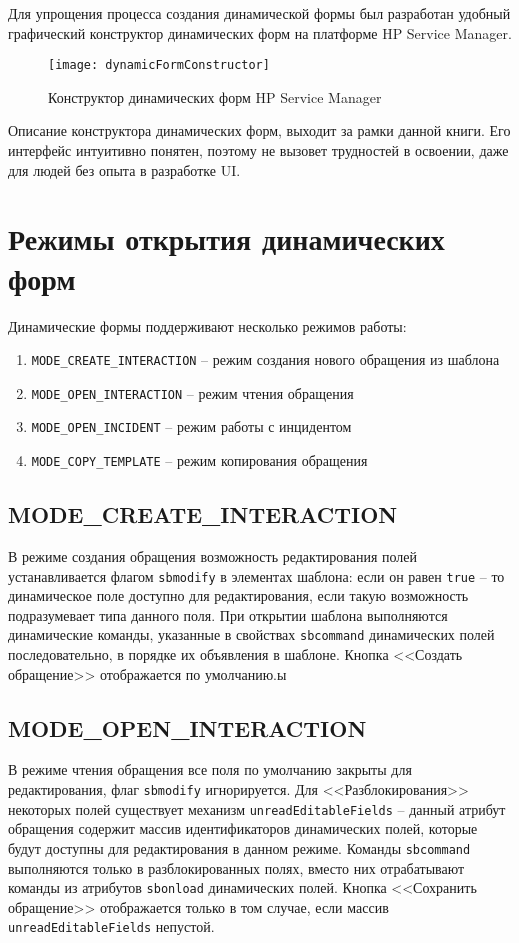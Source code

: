 \documentclass[../index.tex]{subfiles}
\begin{document}
Для упрощения процесса создания динамической формы был разработан удобный графический конструктор
динамических форм на платформе HP Service Manager.

\begin{figure}[h]
    \texttt{[image: dynamicFormConstructor]}
    \centering
    \caption{Конструктор динамических форм HP Service Manager}
\end{figure}

Описание конструктора динамических форм, выходит за рамки данной книги.
Его интерфейс интуитивно понятен, поэтому не вызовет трудностей в освоении,
даже для людей без опыта в разработке UI.

\section{Режимы открытия динамических форм}
Динамические формы поддерживают несколько режимов работы:

\begin{enumerate}
    \item \verb|MODE_CREATE_INTERACTION| -- режим создания нового обращения из шаблона
    \item \verb|MODE_OPEN_INTERACTION| -- режим чтения обращения
    \item \verb|MODE_OPEN_INCIDENT| -- режим работы с инцидентом
    \item \verb|MODE_COPY_TEMPLATE| -- режим копирования обращения
\end{enumerate}

\subsection{MODE\_CREATE\_INTERACTION}
В режиме создания обращения возможность редактирования полей устанавливается 
флагом \verb|sbmodify| в элементах шаблона: если он равен \verb|true| -- то динамическое поле доступно для редактирования, если такую возможность подразумевает типа данного поля.
При открытии шаблона выполняются динамические команды, указанные в свойствах  \verb|sbcommand| динамических
полей последовательно, в порядке их объявления в шаблоне. Кнопка <<Создать обращение>> отображается по умолчанию.ы
    
\subsection{MODE\_OPEN\_INTERACTION}
В режиме чтения обращения все поля по умолчанию закрыты для редактирования, флаг \verb|sbmodify| игнорируется.
Для <<Разблокирования>> некоторых полей существует механизм \verb|unreadEditableFields| -- данный атрибут обращения содержит массив идентификаторов динамических полей, которые будут доступны для редактирования в данном режиме. Команды \verb|sbcommand| выполняются только в разблокированных полях, вместо них отрабатывают команды из атрибутов \verb|sbonload| динамических полей. Кнопка <<Сохранить обращение>> отображается только в том случае, если массив \verb|unreadEditableFields| непустой.
\end{document}
